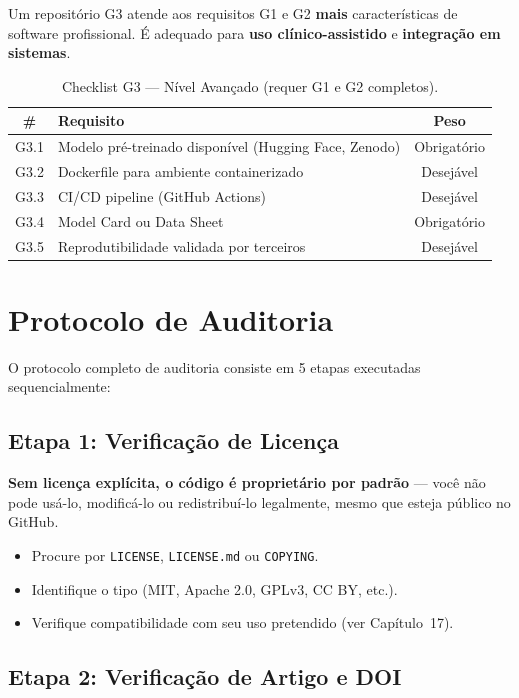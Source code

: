 Um repositório G3 atende aos requisitos G1 e G2 \textbf{mais}
características de software profissional. É adequado para \textbf{uso
clínico-assistido} e \textbf{integração em sistemas}.

\begin{table}[H]
  \centering
  \caption{Checklist G3 — Nível Avançado (requer G1 e G2 completos).}
  \label{tab:g3-checklist}
  \begin{tabularx}{\textwidth}{cXc}
    \toprule
    \textbf{\#} & \textbf{Requisito} & \textbf{Peso} \\
    \midrule
    G3.1 & Modelo pré-treinado disponível (Hugging Face, Zenodo) & Obrigatório \\
    G3.2 & Dockerfile para ambiente containerizado & Desejável \\
    G3.3 & CI/CD pipeline (GitHub Actions) & Desejável \\
    G3.4 & Model Card ou Data Sheet & Obrigatório \\
    G3.5 & Reprodutibilidade validada por terceiros & Desejável \\
    \bottomrule
  \end{tabularx}
\end{table}

\section{Protocolo de Auditoria}

O protocolo completo de auditoria consiste em 5 etapas executadas
sequencialmente:

\subsection{Etapa 1: Verificação de Licença}

\textbf{Sem licença explícita, o código é proprietário por padrão} —
você não pode usá-lo, modificá-lo ou redistribuí-lo legalmente, mesmo
que esteja público no GitHub.

\begin{itemize}
  \item Procure por \texttt{LICENSE}, \texttt{LICENSE.md} ou \texttt{COPYING}.
  \item Identifique o tipo (MIT, Apache 2.0, GPLv3, CC BY, etc.).
  \item Verifique compatibilidade com seu uso pretendido (ver Capítulo~17).
\end{itemize}

\subsection{Etapa 2: Verificação de Artigo e DOI}

